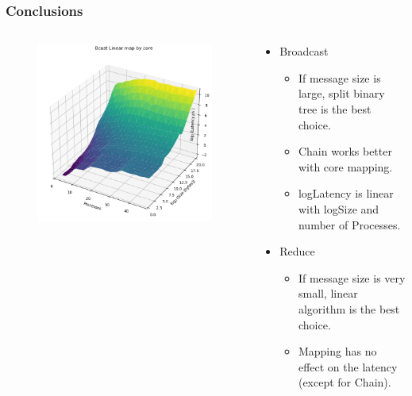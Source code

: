 \documentclass{beamer}
\begin{document}
\begin{frame}
    \frametitle{Conclusions}

    \begin{columns}[T]
        
        \begin{column}{0.5\textwidth}
            \begin{figure}
                \centering
                \includegraphics[width=\textwidth]{../../plots/bcast_linear_core_3d.png}
            \end{figure}
        \end{column}

        \begin{column}{0.6\textwidth}
            \begin{itemize}
                \item Broadcast
                    \begin{itemize}
                        \item If message size is large, split binary tree is the best choice.
                        \item Chain works better with core mapping.
                        \item logLatency is linear with logSize and number of Processes.
                    \end{itemize}
                \item Reduce
                    \begin{itemize}
                        \item If message size is very small, linear algorithm is the best choice.
                        \item Mapping has no effect on the latency (except for Chain).
                    \end{itemize}
            \end{itemize}
        \end{column}

    \end{columns}

\end{frame}
\end{document}
